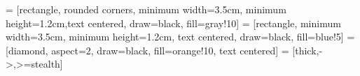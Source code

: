 \usepackage{amsmath} %
\usepackage{amssymb} %




\usepackage{graphicx}
\usepackage{array}
\usepackage{tabularx}
\usepackage{tabularray}

\usepackage{float}      %
\usepackage{longtable}


\usepackage[table,xcdraw]{xcolor}

\newcommand{\elcol}[3]{\if\relax\detokenize{#1}\relax\begin{tabular}{@{}c@{}}#2\\[0.3em]#3\end{tabular}\else\cellcolor{#1}\begin{tabular}{@{}c@{}}#2\\[0.3em]#3\end{tabular}\fi}





\usepackage{pdflscape} %

\setlength{\arrayrulewidth}{0.5mm} %
\renewcommand{\arraystretch}{1.5} %


\usepackage{makecell} 

\usepackage{threeparttable}



\usepackage{tikz}
\usetikzlibrary{shapes.geometric, arrows.meta, positioning}

 = [rectangle, rounded corners, minimum width=3.5cm, minimum height=1.2cm,text centered, draw=black, fill=gray!10]
 = [rectangle, minimum width=3.5cm, minimum height=1.2cm, text centered, draw=black, fill=blue!5]
 = [diamond, aspect=2, draw=black, fill=orange!10, text centered]
 = [thick,->,>=stealth]
